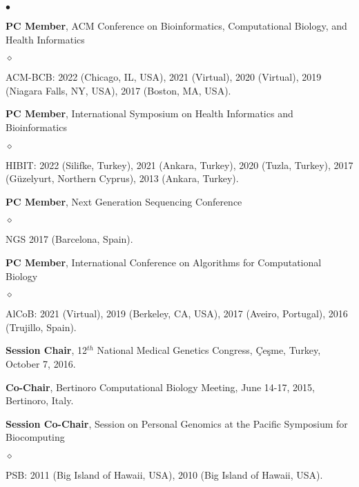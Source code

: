 \documentclass[margin,line]{res}
\newenvironment{list2}{
  \begin{list}{$\bullet$}{%
      \setlength{\itemsep}{0.1cm}
      \setlength{\parsep}{0in} \setlength{\parskip}{0in}
      \setlength{\topsep}{0in} \setlength{\partopsep}{0in} 
      \setlength{\leftmargin}{0.2in}}}{\end{list}}
\newenvironment{list3}{
  \begin{list}{$\diamond$}{%
      \setlength{\itemsep}{0in}
      \setlength{\parsep}{0.1cm} \setlength{\parskip}{0.1cm}
      \setlength{\topsep}{0.1cm} \setlength{\partopsep}{0.1cm} 
      \setlength{\leftmargin}{0.2in}}}{\end{list}}
\begin{document}
\begin{resume}
\begin{list2}
    \item
        \textbf{PC Member},  ACM Conference on Bioinformatics, Computational Biology, and Health Informatics
        \begin{list3}
            \item ACM-BCB: 2022 (Chicago, IL, USA), 2021 (Virtual),  2020 (Virtual), 2019 (Niagara Falls, NY, USA), 2017 (Boston, MA, USA).
        \end{list3}
    
    \item
        \textbf{PC Member},  International Symposium on Health Informatics and Bioinformatics
        \begin{list3}
            \item HIBIT: 2022 (Silifke, Turkey),  2021 (Ankara, Turkey),  2020 (Tuzla, Turkey),  2017 (Güzelyurt, Northern Cyprus),  2013 (Ankara, Turkey).
        \end{list3}
    
    \item
        \textbf{PC Member},  Next Generation Sequencing Conference
        \begin{list3}
            \item NGS 2017 (Barcelona, Spain).
        \end{list3}
    
    \item
        \textbf{PC Member}, International Conference on Algorithms for Computational Biology 
        \begin{list3}
            \item AlCoB: 2021 (Virtual),  2019 (Berkeley, CA, USA),  2017 (Aveiro, Portugal), 2016 (Trujillo, Spain).
        \end{list3}
      
    \item
        \textbf{Session Chair}, 12$^{th}$ National Medical Genetics Congress, Çeşme, Turkey, October 7, 2016.
    
    \item
        \textbf{Co-Chair}, Bertinoro Computational Biology Meeting, June 14-17, 2015, Bertinoro, Italy.
    
    \item 
        \textbf{Session Co-Chair}, Session on Personal Genomics at the Pacific Symposium for Biocomputing 
        \begin{list3}
            \item PSB: 2011 (Big Island of Hawaii, USA), 2010 (Big Island of Hawaii, USA).
        \end{list3}
        

\end{list2}
\end{resume}
\end{document}
